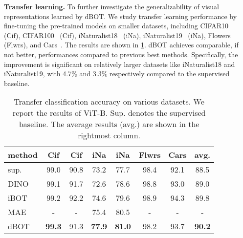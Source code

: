 \documentclass[10pt,twocolumn,letterpaper]{article}
\renewcommand{\paragraph}[1]{\vspace{1.25mm}\noindent\textbf{#1}}
\def\ourmethod{{dBOT}\xspace}
\begin{document}
\paragraph{Transfer learning.}
To further investigate the generalizability of visual representations learned by \ourmethod.
We study transfer learning performance by fine-tuning the pre-trained models on smaller datasets, including CIFAR10~\cite{krizhevsky2009learning} (Cif), CIFAR100~\cite{krizhevsky2009learning} (Cif), iNaturalist18~\cite{van2018inaturalist} (iNa), iNaturalist19~\cite{van2018inaturalist} (iNa), Flowers~\cite{nilsback2008automated} (Flwrs), and Cars~\cite{krause20133d}. 
The results are shown in \cref{tab:transfer}. \ourmethod achieves comparable, if not better, performances compared to previous best methods. 
Specifically, the improvement is significant on relatively larger datasets like iNaturalist18 and iNaturalist19, with 4.7\% and 3.3\% respectively compared to the supervised baseline.


\begin{table}
    \begin{center}
    \setlength{\tabcolsep}{0.8mm}
    \begin{tabular}{l|cccccc|c}
        {method}& Cif&Cif&iNa&iNa&Flwrs&Cars& avg. \\
        \hline
        \textcolor{gray!80}{sup.~\cite{zhou2021ibot}}& \textcolor{gray!80}{99.0}&   \textcolor{gray!80}{90.8}&   \textcolor{gray!80}{73.2}& \textcolor{gray!80}{77.7}&   \textcolor{gray!80}{98.4}&   \textcolor{gray!80}{92.1}& \textcolor{gray!80}{88.5} \\
        DINO~\cite{dino}&   99.1&   91.7&   72.6&   78.6&   98.8&   93.0&89.0 \\
        iBOT~\cite{zhou2021ibot}&   99.2&   92.2&   74.6&   79.6&   98.9&   94.3& 89.8 \\
        MAE~\cite{mae}&   -&   -& 75.4&   80.5& -& -& - \\
        \hline
        \ourmethod&\textbf{99.3}&91.3&\textbf{77.9}&\textbf{81.0}&98.2&93.7&\textbf{90.2} \\
    \end{tabular}
    \end{center}
    \caption{Transfer classification accuracy on various datasets. We report the results of ViT-B.
    Sup. denotes the supervised baseline. The average results (avg.) are shown in the rightmost column. 
    }
    \label{tab:transfer}
\vspace{-0.2cm}
\end{table}
\end{document}
